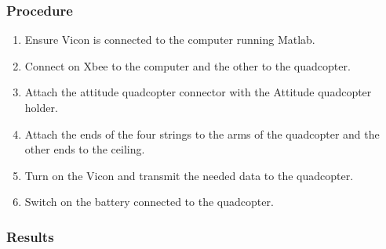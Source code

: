 \subsubsection{Procedure}
\begin{enumerate}
	\item Ensure Vicon is connected to the computer running Matlab.
	\item Connect on Xbee to the computer and the other to the quadcopter.
	\item Attach the attitude quadcopter connector with the Attitude quadcopter holder.
	\item Attach the ends of the four strings to the arms of the quadcopter and the other ends to the ceiling.
	\item Turn on the Vicon and transmit the needed data to the quadcopter.
	\item Switch on the battery connected to the quadcopter.
\end{enumerate}

\subsubsection{Results}


